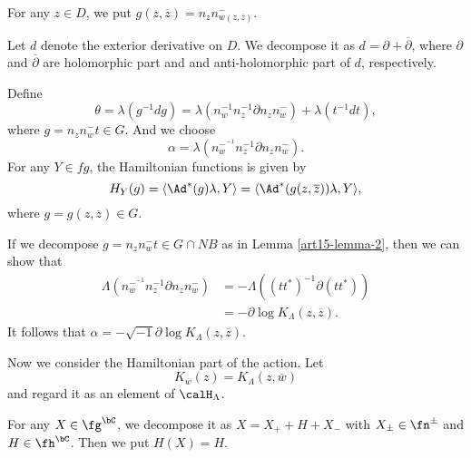 For any $z \in D$, we put $g(z, \overline{z})=n_{z}n_{w(z, \overline{z})}^{-}$.

Let $d$ denote the exterior derivative on $D$. We decompose it as $d=\partial + \overline{\partial}$, where $\partial$ and $\overline{\partial}$ are holomorphic part and and anti-holomorphic part of $d$, respectively.

Define
$$
\theta= \lambda(g^{-1} dg)= \lambda(n_{w}^{-1} n_{z}^{-1}\partial n_{z}n_{w}^{-}) + \lambda(t^{-1}dt),
$$
where $g=n_{z}n_{w}^{-}t \in G$. And we choose
$$
\alpha = \lambda(n_{w}^{-^{-1}}n_{z}^{-1}\partial n_{z}n_{w}^{-}).
$$
For any $Y \in fg$, the Hamiltonian functions is given by
$$
H_{Y}(g)= \langle \Ad^{*}(g)\lambda, Y\rangle= \langle\Ad^{*}(g(z, \overline{z}))\lambda, Y\rangle,
$$
where $g=g(z, \overline{z})\in G$.

If we decompose $g = n_{z}n_{w}^{-}t \in G \cap N B$ as in Lemma \ref{art15-lemma-2}, then we can show that
\begin{align*}
\Lambda(n_{w}^{-^{-1}}n_{z}^{-1}\partial n_{z}n_{w}^{-}) &= -\Lambda((tt^{*})^{-1}\partial(tt^{*}))\\
&= -\partial \log K_{\Lambda}(z, \overline{z}).
\end{align*}
It follows that $\alpha = -\sqrt{-1}\partial \log K_{\Lambda}(z, \overline{z})$.

Now we consider the Hamiltonian part of the action. Let
$$
K_{\overline{w}}(z)=K_{\Lambda}(z, \overline{w})
$$
and regard it as an element of $\calH_{\Lambda}$.

For any $X \in \fg^{\bC}$, we decompose it as $X=X_{+}+H + X_{-}$ with $X_{\pm} \in \fn^{\pm}$ and $H \in \fh^{\bC}$. Then we put $H(X)=H$.

